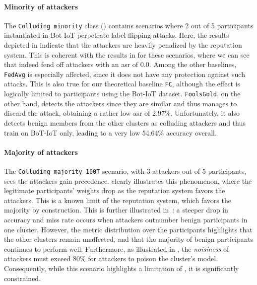 \paragraph*{Minority of attackers\label{sec:radar.results.flipping.minority}}

The \texttt{Colluding minority} class () contains scenarios where 2 out of 5 participants instantiated in Bot-IoT perpetrate label-flipping attacks.
Here, the results depicted in  indicate that the attackers are heavily penalized by the reputation system. 
This is coherent with the results in  for these scenarios, where we can see that \thecontrib indeed fend off attackers with an \gls{asr} of 0.0.
Among the other baselines, \texttt{FedAvg} is especially affected, since it does not have any protection against such attacks.
This is also true for our theoretical baseline \texttt{FC}, although the effect is logically limited to participants using the Bot-IoT dataset.
\texttt{FoolsGold}, on the other hand, detects the attackers since they are similar and thus manages to discard the attack, obtaining a rather low \gls{asr} of 2.97\%.
Unfortunately, it also detects benign members from the other clusters as colluding attackers and thus train on BoT-IoT only, leading to a very low 54.64\% accuracy overall.


\paragraph*{Majority of attackers\label{sec:radar.results.flipping.majority}}

The \texttt{Colluding majority 100T} scenario, with 3 attackers out of 5 participants, sees the attackers gain precedence.
 clearly illustrates this phenomenon, where the legitimate participants' weights drop as the reputation system favors the attackers.
This is a known limit of the reputation system, which favors the majority by construction.
This is further illustrated in~: a steeper drop in accuracy and miss rate occurs when attackers outnumber benign participants in one cluster.
However, the metric distribution over the participants highlights that the other clusters remain unaffected, and that the majority of benign participants continues to perform well.
Furthermore, as illustrated in , the \emph{noisiness} of attackers must exceed 80\% for attackers to poison the cluster's model.
Consequently, while this scenario highlights a limitation of \thecontrib, it is significantly constrained.


